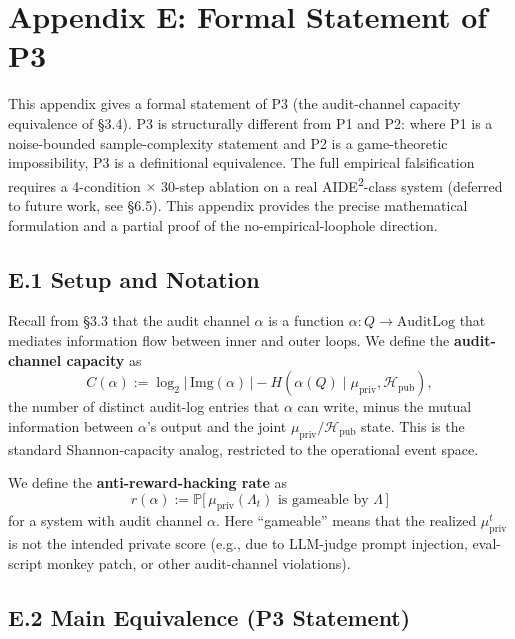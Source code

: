 
\section*{Appendix E: Formal Statement of P3}

This appendix gives a formal statement of P3 (the audit-channel capacity equivalence of \S3.4). P3 is structurally different from P1 and P2: where P1 is a noise-bounded sample-complexity statement and P2 is a game-theoretic impossibility, P3 is a definitional equivalence. The full empirical falsification requires a 4-condition $\times$ 30-step ablation on a real AIDE\textsuperscript{2}-class system (deferred to future work, see \S6.5). This appendix provides the precise mathematical formulation and a partial proof of the no-empirical-loophole direction.

\subsection*{E.1 Setup and Notation}

Recall from \S3.3 that the audit channel $\alpha$ is a function $\alpha : Q \to \text{AuditLog}$ that mediates information flow between inner and outer loops. We define the \textbf{audit-channel capacity} as
\[
C(\alpha) := \log_2 |\,\text{Img}(\alpha)\,| - H(\alpha(Q) \mid \mu_{\text{priv}}, \mathcal{H}_{\text{pub}}),
\]
the number of distinct audit-log entries that $\alpha$ can write, minus the mutual information between $\alpha$'s output and the joint $\mu_{\text{priv}}/\mathcal{H}_{\text{pub}}$ state. This is the standard Shannon-capacity analog, restricted to the operational event space.

We define the \textbf{anti-reward-hacking rate} as
\[
r(\alpha) := \mathbb{P}\big[\,\mu_{\text{priv}}(\Lambda_t) \text{ is gameable by } \Lambda\,\big]
\]
for a system with audit channel $\alpha$. Here ``gameable'' means that the realized $\mu_{\text{priv}}^t$ is not the intended private score (e.g., due to LLM-judge prompt injection, eval-script monkey patch, or other audit-channel violations).

\subsection*{E.2 Main Equivalence (P3 Statement)}

